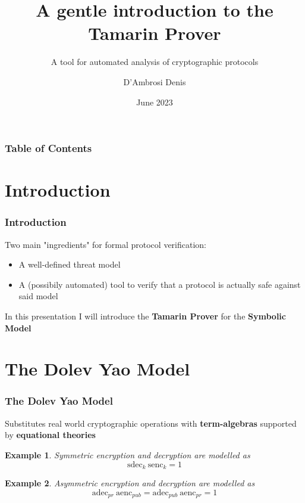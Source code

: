 \documentclass[aspectratio=169,t,xcolor=table]{beamer}
\newtheorem{ex}{Example}
\begin{document}
\title[Inf UFG]{A gentle introduction to the Tamarin Prover}
\subtitle{A tool for automated analysis of cryptographic protocols}

\author{D'Ambrosi Denis}

\date{June 2023}
\frame[noframenumbering]{\titlepage}



\begin{frame}
    \frametitle{Table of Contents}
    \tableofcontents
\end{frame}

\section{Introduction}

\begin{frame}
    \frametitle{Introduction}

    \begin{block}{}
        Two main "ingredients" for formal protocol verification:

        \begin{itemize}
            \item A well-defined threat model
            \item A (possibily automated) tool to verify that a protocol is actually safe against said model
        \end{itemize}
    \end{block}

    In this presentation I will introduce the \textbf{Tamarin Prover} for the \textbf{Symbolic Model}
\end{frame}

\section{The Dolev Yao Model}

\begin{frame}
    \frametitle{The Dolev Yao Model}

    Substitutes real world cryptographic operations with \textbf{term-algebras} supported by \textbf{equational theories}
    \begin{ex}
        Symmetric encryption and decryption are modelled as
        $$\textrm{sdec}_k\ \textrm{senc}_k = 1$$
    \end{ex}

    \begin{ex}
        Asymmetric encryption and decryption are modelled as
        $$\textrm{adec}_{pr}\ \textrm{aenc}_{pub} = \textrm{adec}_{pub}\ \textrm{aenc}_{pr} = 1$$
    \end{ex}
\end{frame}
\end{document}

